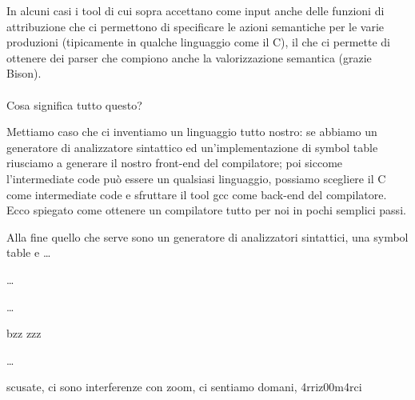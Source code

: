 \documentclass[class=book, crop=false, oneside, 12pt]{standalone}
\begin{document}
In alcuni casi i tool di cui sopra accettano come input anche delle funzioni di attribuzione che ci permettono di specificare le azioni semantiche per le varie produzioni (tipicamente in qualche linguaggio come il C), il che ci permette di ottenere dei parser che compiono anche la valorizzazione semantica (grazie Bison).
\\\\
Cosa significa tutto questo?

Mettiamo caso che ci inventiamo un linguaggio tutto nostro: se abbiamo un generatore di analizzatore sintattico ed un'implementazione di symbol table riusciamo a generare il nostro front-end del compilatore; poi siccome l'intermediate code può essere un qualsiasi linguaggio, possiamo scegliere il C come intermediate code e sfruttare il tool gcc come back-end del compilatore.
Ecco spiegato come ottenere un compilatore tutto per noi in pochi semplici passi.

Alla fine quello che serve sono un generatore di analizzatori sintattici, una symbol table e \dots


\dots


\dots


bzz zzz

\dots

scusate, ci sono interferenze con zoom, ci sentiamo domani, 4rriz00m4rci 
\end{document}
